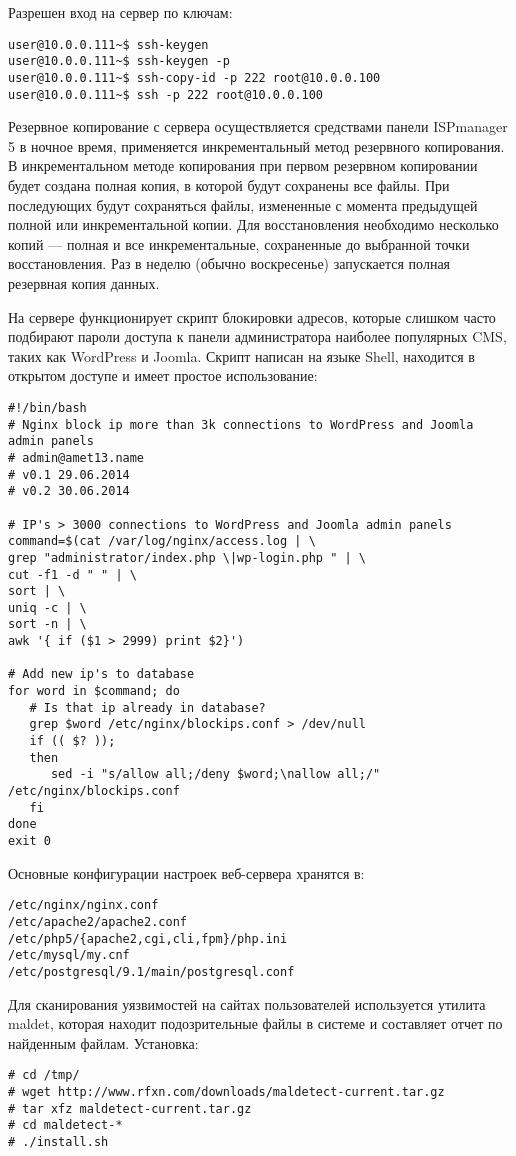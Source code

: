 Разрешен вход на сервер по ключам:
\begin{lstlisting}
user@10.0.0.111~$ ssh-keygen
user@10.0.0.111~$ ssh-keygen -p
user@10.0.0.111~$ ssh-copy-id -p 222 root@10.0.0.100
user@10.0.0.111~$ ssh -p 222 root@10.0.0.100
\end{lstlisting}

Резервное копирование с сервера осуществляется средствами панели ISPmanager 5 в ночное время, применяется инкрементальный метод резервного копирования.
В инкрементальном методе копирования при первом резервном копировании будет создана полная копия, в которой будут сохранены все файлы.
При последующих будут сохраняться файлы, измененные с момента предыдущей полной или инкрементальной копии.
Для восстановления необходимо несколько копий --- полная и все инкрементальные, сохраненные до выбранной точки восстановления.
Раз в неделю (обычно воскресенье) запускается полная резервная копия данных.

На сервере функционирует скрипт блокировки адресов, которые слишком часто подбирают пароли доступа к панели администратора наиболее популярных CMS, таких как WordPress и Joomla.
Скрипт написан на языке Shell, находится в открытом доступе и имеет простое использование:
\begin{lstlisting}
#!/bin/bash
# Nginx block ip more than 3k connections to WordPress and Joomla admin panels
# admin@amet13.name
# v0.1 29.06.2014
# v0.2 30.06.2014

# IP's > 3000 connections to WordPress and Joomla admin panels
command=$(cat /var/log/nginx/access.log | \
grep "administrator/index.php \|wp-login.php " | \
cut -f1 -d " " | \
sort | \
uniq -c | \
sort -n | \
awk '{ if ($1 > 2999) print $2}')

# Add new ip's to database
for word in $command; do
   # Is that ip already in database?
   grep $word /etc/nginx/blockips.conf > /dev/null
   if (( $? ));
   then 
      sed -i "s/allow all;/deny $word;\nallow all;/" /etc/nginx/blockips.conf
   fi
done
exit 0
\end{lstlisting}

Основные конфигурации настроек веб-сервера хранятся в:
\begin{lstlisting}
/etc/nginx/nginx.conf
/etc/apache2/apache2.conf
/etc/php5/{apache2,cgi,cli,fpm}/php.ini
/etc/mysql/my.cnf
/etc/postgresql/9.1/main/postgresql.conf
\end{lstlisting}

Для сканирования уязвимостей на сайтах пользователей используется утилита maldet, которая находит подозрительные файлы в системе и составляет отчет по найденным файлам.
Установка:
\begin{lstlisting}
# cd /tmp/
# wget http://www.rfxn.com/downloads/maldetect-current.tar.gz
# tar xfz maldetect-current.tar.gz
# cd maldetect-*
# ./install.sh
\end{lstlisting}

